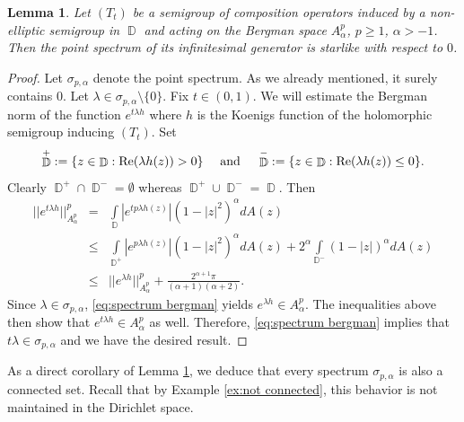 \documentclass[11pt]{amsart}
\numberwithin{equation}{section}
\newtheorem{lemma}[theorem]{Lemma}
\theoremstyle{definition}
\DeclareMathOperator{\D}{\mathbb{D}}
\begin{document}
	\begin{lemma}\label{lm:spectrum starlike}
		Let $(T_t)$ be a semigroup of composition operators induced by a non-elliptic semigroup in $\D$ and acting on the Bergman space $A_\alpha^p$, $p\ge1$, $\alpha>-1$. Then the point spectrum of its infinitesimal generator is starlike with respect to $0$.
	\end{lemma}
	\begin{proof}
		Let $\sigma_{p,\alpha}$ denote the point spectrum. As we already mentioned, it surely contains $0$. Let $\lambda\in\sigma_{p,\alpha}\setminus\{0\}$. Fix $t\in(0,1)$. We will estimate the Bergman norm of the function $e^{t\lambda h}$ where $h$ is the Koenigs function of the holomorphic semigroup inducing $(T_t)$. Set 
		$$\D^+:=\{z\in\D:\mathrm{Re}(\lambda h(z))>0\} \quad\textup{ and }\quad \D^-:=\{z\in\D:\mathrm{Re}(\lambda h(z))\le 0\}.$$
		Clearly $\D^+\cap\D^-=\emptyset$ whereas $\D^+\cup\D^-=\D$. Then
		\begin{eqnarray*}
			||e^{t\lambda h}||_{A^p_\alpha}^p&=&\int\limits_{\D}\left|e^{tp\lambda h(z)}\right|(1-|z|^2)^{\alpha}dA(z)\\
			&\le&\int\limits_{\D^+}\left|e^{p\lambda h(z)}\right|(1-|z|^2)^\alpha dA(z)+2^\alpha\int\limits_{\D^-}(1-|z|)^\alpha dA(z)\\
			&\le&||e^{\lambda h}||_{A_\alpha^p}^p+\frac{2^{\alpha+1}\pi}{(\alpha+1)(\alpha+2)}.
		\end{eqnarray*}
		Since $\lambda\in\sigma_{p, \alpha}$, \eqref{eq:spectrum bergman} yields $e^{\lambda h}\in A_{\alpha}^p$. The inequalities above then show that $e^{t\lambda h}\in A_\alpha^p$ as well. Therefore, \eqref{eq:spectrum bergman} implies that $t\lambda\in\sigma_{p, \alpha}$ and we have the desired result.
	\end{proof}
	
	As a direct corollary of Lemma \ref{lm:spectrum starlike}, we deduce that every spectrum $\sigma_{p,\alpha}$ is also a connected set. Recall that by Example \ref{ex:not connected}, this behavior is not maintained in the Dirichlet space.  
	
\end{document}
